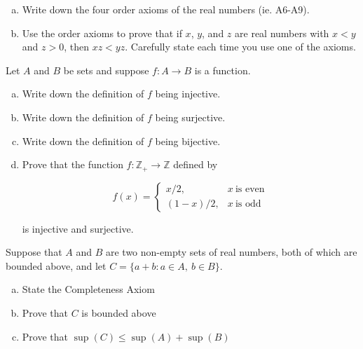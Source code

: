 \documentclass[11pt]{exam}
\theoremstyle{definition}
\begin{document}
\begin{questions}
\newpage
\question[10]\mbox{}

\begin{enumerate}[(a)]
\item  Write down the four order axioms of the real numbers (ie. A6-A9).
\vspace{4in}
\item  Use the order axioms to prove that if $x$, $y$, and $z$ are real numbers with $x < y$ and $z > 0$, then $xz < yz$.  Carefully state each time you use one of the axioms.
\end{enumerate}

\newpage
\question[10]\mbox{}

Let $A$ and $B$ be sets and suppose $f: A\rightarrow B$ is a function.

\begin{enumerate}[(a)]
\item  Write down the definition of $f$ being injective.
\vspace{1in}
\item  Write down the definition of $f$ being surjective.
\vspace{1in}
\item  Write down the definition of $f$ being bijective.
\vspace{1in}
\item  Prove that the function $f: \mathbb Z_+\rightarrow\mathbb Z$ defined by

$$f(x) = \left\lbrace\begin{array}{cc}
x/2, & x\ \text{is even}\\
(1-x)/2, & x\ \text{is odd}
\end{array}\right.$$

is injective and surjective.
\end{enumerate}

\newpage
\question[10]\mbox{}

Suppose that $A$ and $B$ are two non-empty sets of real numbers, both of which are bounded above, and let $C=\{a+b: a\in A,\ b\in B\}$.

\begin{enumerate}[(a)]
\item State the Completeness Axiom
\vspace{1in}
\item Prove that $C$ is bounded above
\vspace{3in}
\item Prove that $\sup(C)\leq \sup(A) + \sup(B)$
\end{enumerate}


\end{questions}
\end{document}
